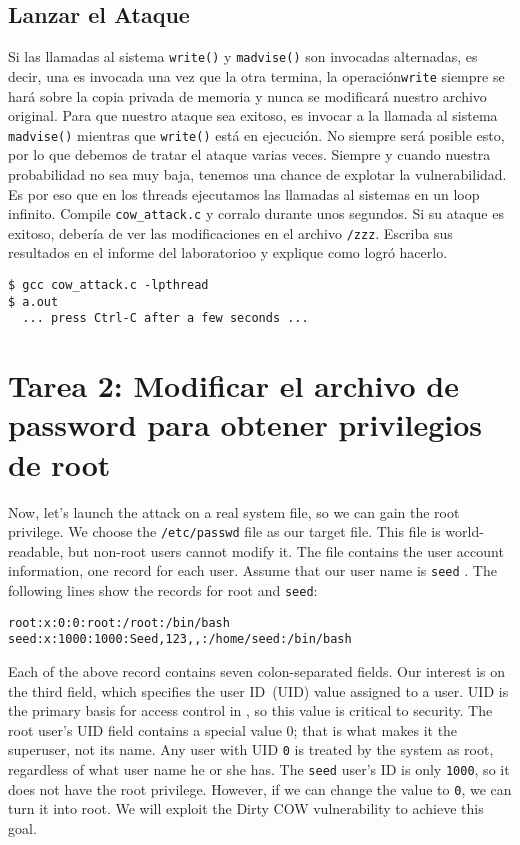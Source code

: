 \subsection{Lanzar el Ataque}

Si las llamadas al sistema \texttt{write()} y  \texttt{madvise()}  son invocadas alternadas, es decir, una es invocada una vez que la otra termina, la operación\texttt{write} siempre se hará sobre la copia privada de memoria y nunca se modificará nuestro archivo original. Para que nuestro ataque sea exitoso, es invocar a  la llamada al sistema \texttt{madvise()} mientras que \texttt{write()} está en ejecución. No siempre será posible esto, por lo que debemos de tratar el ataque varias veces. Siempre y cuando nuestra probabilidad no sea muy baja, tenemos una chance de explotar la vulnerabilidad. Es por eso que en los threads ejecutamos las llamadas al sistemas en un loop infinito.
Compile \texttt{cow\_attack.c} y corralo durante unos segundos. Si su ataque es exitoso, debería de ver las modificaciones en el archivo \texttt{/zzz}.
Escriba sus resultados en el informe del laboratorioo y explique como logró hacerlo.


\begin{lstlisting}
$ gcc cow_attack.c -lpthread
$ a.out
  ... press Ctrl-C after a few seconds ...
\end{lstlisting}



\section{Tarea 2: Modificar el archivo de password para obtener privilegios de root} 

Now, let's launch the attack on a real system file, so we can gain the root privilege.
We choose the \texttt{/etc/passwd} file as our target file. This file
is world-readable, but non-root users cannot modify it. The file contains
the user account information, one record for each user.  Assume that our user name is
\texttt{seed} . The following lines show the records for root and \texttt{seed}:

\begin{lstlisting}
root:x:0:0:root:/root:/bin/bash
seed:x:1000:1000:Seed,123,,:/home/seed:/bin/bash
\end{lstlisting}

Each of the above record contains seven colon-separated fields. Our interest is on the third
field, which specifies the user ID~(UID) value assigned to a user. UID is the primary
basis for access control in \linux, so this value is critical to security.
The root user's UID field contains a special value 0; that is what makes it the superuser,
not its name. Any user with UID \texttt{0} is treated by the system as root,
regardless of what user name he or she has.
The \texttt{seed} user's ID is only \texttt{1000}, so
it does not have the root privilege. However, if we can change the value to
\texttt{0}, we can turn it
into root. We will exploit the Dirty COW vulnerability to achieve this goal.

